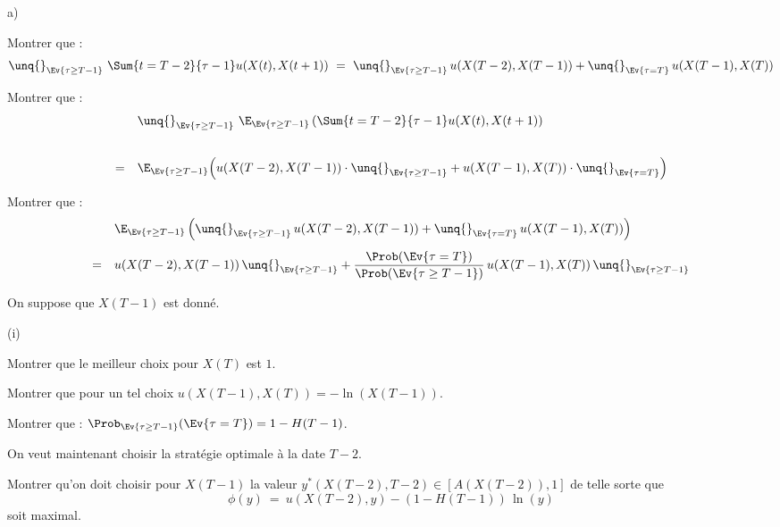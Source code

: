   
  \begin{noliste}{a)}
    \setlength{\itemsep}{2mm}
    \item Montrer que :
    \[
      \unq{}_{\Ev{\tau \geq T-1}} \ \Sum{t=T-2}{\tau-1} 
      u(X(t),X(t+1))
      \ = \ \unq{}_{\Ev{\tau \geq T-1}} \, u(X(T-2),X(T-1)) + 
      \unq{}_{\Ev{\tau = T}} \, u(X(T-1),X(T))
    \]
    
    
    
    \item Montrer que :
    \[
     \begin{array}{cl}
      & \unq{}_{\Ev{\tau \geq T-1}} \ \E_{\Ev{\tau \geq T-1}} 
      \left( \Sum{t=T-2}{\tau -1} u(X(t),X(t+1)\right) 
      \\[.8cm]
      = &
      \E_{\Ev{\tau \geq T-1}} \Big( u(X(T-2),X(T-1)) \cdot
      \unq{}_{\Ev{\tau \geq T-1}} + u(X(T-1),X(T)) \cdot 
      \unq{}_{\Ev{\tau = T}}\Big)
     \end{array}
    \]
    
    
    
    
    
    
    \item Montrer que :
    \[
     \begin{array}{cl}
      & \E_{\Ev{\tau \geq T-1}}\left( \unq{}_{\Ev{\tau \geq T-1}} \, 
      u(X(T-2),X(T-1)) + \unq{}_{\Ev{\tau = T}} \, u(X(T-1), 
      X(T))\right)
      \\[.4cm]
      = &
      u(X(T-2), X(T-1)) \, \unq{}_{\Ev{\tau \geq T-1}} + 
      \dfrac{\Prob(\Ev{\tau =T})}{\Prob(\Ev{\tau \geq T-1})} \, 
      u(X(T-1), X(T)) \, \unq{}_{\Ev{\tau \geq T-1}}
     \end{array}
    \]
    
    
    
    \item On suppose que $X(T-1)$ est donné.
    \begin{nonoliste}{(i)}
      \item Montrer que le meilleur choix pour $X(T)$ est $1$.
      
      

      
      \item Montrer que pour un tel choix $u(X(T-1), X(T)) = 
      - \ln (X(T-1))$.
      
      
    \end{nonoliste}
    
    
    
    
    \item Montrer que : $\Prob_{\Ev{\tau \geq T-1}}(\Ev{\tau = T})
    =1- H(T-1)$.
    
    
    
    On veut maintenant choisir la stratégie optimale à la date $T-2$.
    
    \item Montrer qu'on doit choisir pour $X(T-1)$ la valeur $y^*(
    X(T-2),T-2) \in [A(X(T-2)),1]$ de telle sorte que 
    \[
      \phi(y) \ = \ u(X(T-2),y) - (1-H(T-1)) \, \ln(y)
    \]
    soit maximal.
  \end{noliste}
    
